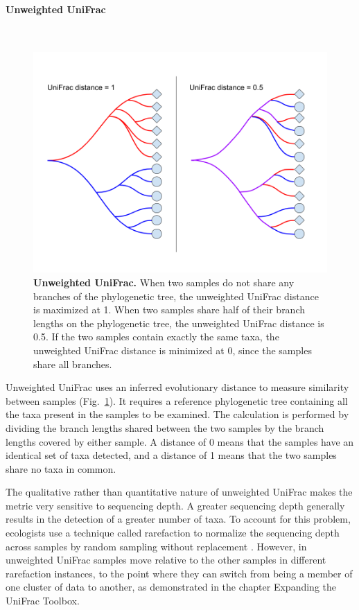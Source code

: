 \paragraph{Unweighted UniFrac}\mbox{}\\

\begin{figure}[h]
\begin{center}
\includegraphics[width=\textwidth]{unifrac.png}
\caption[Unweighted UniFrac.]{\textbf{Unweighted UniFrac.} When two samples do not share any branches of the phylogenetic tree, the unweighted UniFrac distance is maximized at 1. When two samples share half of their branch lengths on the phylogenetic tree, the unweighted UniFrac distance is 0.5. If the two samples contain exactly the same taxa, the unweighted UniFrac distance is minimized at 0, since the samples share all branches.}
\end{center}
\label{unweighted_unifrac}
\end{figure}

Unweighted UniFrac uses an inferred evolutionary distance to measure similarity between samples (Fig.~\ref{unweighted_unifrac}). It requires a reference phylogenetic tree containing all the taxa present in the samples to be examined. The calculation is performed by dividing the branch lengths shared between the two samples by the branch lengths covered by either sample. A distance of 0 means that the samples have an identical set of taxa detected, and a distance of 1 means that the two samples share no taxa in common.

The qualitative rather than quantitative nature of unweighted UniFrac makes the metric very sensitive to sequencing depth. A greater sequencing depth generally results in the detection of a greater number of taxa. To account for this problem, ecologists use a technique called rarefaction to normalize the sequencing depth across samples by random sampling without replacement \cite{de2011evaluation}. However, in unweighted UniFrac samples move relative to the other samples in different rarefaction instances, to the point where they can switch from being a member of one cluster of data to another, as demonstrated in the chapter Expanding the UniFrac Toolbox.

